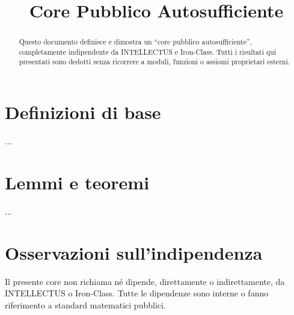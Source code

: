\documentclass[12pt]{article}
\title{Core Pubblico Autosufficiente}
\author{}
\date{}
\begin{document}
\maketitle

\begin{abstract}
Questo documento definisce e dimostra un “core pubblico autosufficiente”, completamente indipendente da INTELLECTUS e Iron-Class. Tutti i risultati qui presentati sono dedotti senza ricorrere a moduli, funzioni o assiomi proprietari esterni.
\end{abstract}

\section{Definizioni di base}
...

\section{Lemmi e teoremi}
...

\section{Osservazioni sull’indipendenza}
Il presente core non richiama né dipende, direttamente o indirettamente, da INTELLECTUS o Iron-Class.  
Tutte le dipendenze sono interne o fanno riferimento a standard matematici pubblici.
\end{document}
